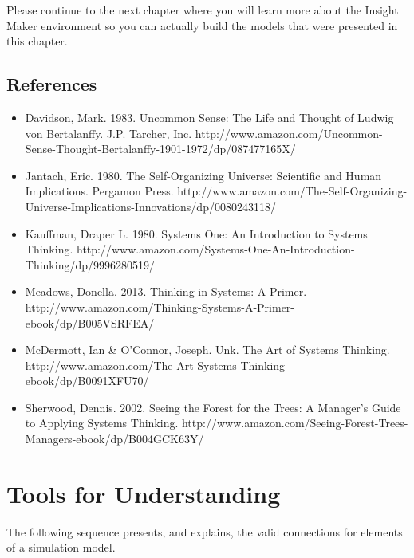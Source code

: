 \documentclass[]{memoir}
\begin{document}
Please continue to the next chapter where you will learn more about the
Insight Maker environment so you can actually build the models that were
presented in this chapter.

\section{References}

\begin{itemize}
\itemsep1pt\parskip0pt
\item
  Davidson, Mark. 1983. Uncommon Sense: The Life and Thought of Ludwig
  von Bertalanffy. J.P. Tarcher, Inc.
  http://www.amazon.com/Uncommon-Sense-Thought-Bertalanffy-1901-1972/dp/087477165X/
\item
  Jantach, Eric. 1980. The Self-Organizing Universe: Scientific and
  Human Implications. Pergamon Press.
  http://www.amazon.com/The-Self-Organizing-Universe-Implications-Innovations/dp/0080243118/
\item
  Kauffman, Draper L. 1980. Systems One: An Introduction to Systems
  Thinking.
  http://www.amazon.com/Systems-One-An-Introduction-Thinking/dp/9996280519/
\item
  Meadows, Donella. 2013. Thinking in Systems: A Primer.
  http://www.amazon.com/Thinking-Systems-A-Primer-ebook/dp/B005VSRFEA/
\item
  McDermott, Ian \& O'Connor, Joseph. Unk. The Art of Systems Thinking.
  http://www.amazon.com/The-Art-Systems-Thinking-ebook/dp/B0091XFU70/
\item
  Sherwood, Dennis. 2002. Seeing the Forest for the Trees: A Manager's
  Guide to Applying Systems Thinking.
  http://www.amazon.com/Seeing-Forest-Trees-Managers-ebook/dp/B004GCK63Y/
\end{itemize}

\chapter{Tools for Understanding}

\FloatBarrier 

\begin{model}[frametitle={Model: Valid Stock \& Variable Connections}] 

 The following sequence presents, and explains, the valid connections for elements of a simulation model.




 \end{model}
\end{document}
